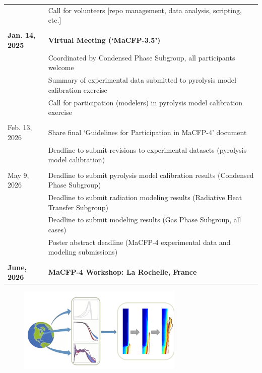 \documentclass[12pt]{article}
\begin{document}
\begin{table} [h!]
\begin{tabular}{p{0.16\linewidth} | p{0.84\linewidth}}
				& Call for volunteers [repo management, data analysis, scripting, etc.]\\
\\
\hline 
\textbf{Jan. 14, 2025}	& \textbf{Virtual Meeting (`MaCFP-3.5')}\\
& Coordinated by Condensed Phase Subgroup, all participants welcome\\
& Summary of experimental data submitted to pyrolysis model calibration exercise\\
                       		& Call for participation (modelers) in pyrolysis model calibration exercise\\
                            \\
Feb. 13, 2026       	& Share final `Guidelines for Participation in MaCFP-4' document\\
				& Deadline to submit revisions to experimental datasets (pyrolysis model calibration)\\
\\
May 9, 2026       	& Deadline to submit pyrolysis model calibration results (Condensed Phase Subgroup)\\
                & Deadline to submit radiation modeling results (Radiative Heat Transfer Subgroup)\\
            & Deadline to submit modeling results (Gas Phase Subgroup, all cases)\\ 
				& Poster abstract deadline (MaCFP-4 experimental data and modeling submissions) \\
\\

\hline
\textbf{June, 2026}       	& \textbf{MaCFP-4 Workshop: La Rochelle, France} \\
\hline
\end{tabular}
\end{table}
\normalsize

\begin{figure}[h!]
  \centering
  \includegraphics[width=3.1in]{../MaCFP_Logo.pdf}
  \label{Cover_Image}
\end{figure}
\end{document}
